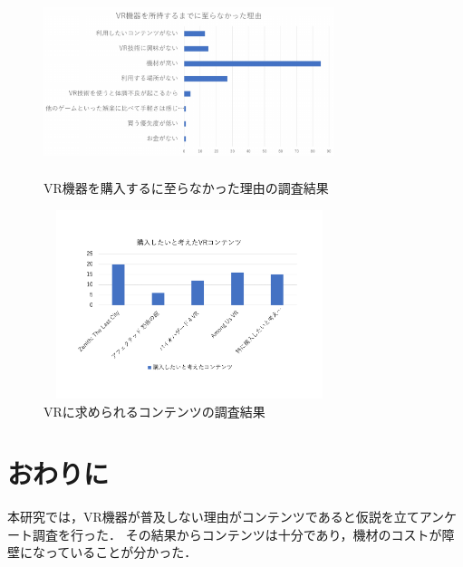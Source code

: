 \documentclass[twocolumn,10pt,a4j]{ltjsarticle}
\begin{document}
\begin{figure}[h]
\begin{center}
 \includegraphics[clip,width=85mm,height=55mm]{vr機器を所持するまでに至らなかった理由.pdf}
\end{center}
 \caption{VR機器を購入するに至らなかった理由の調査結果}
 \label{fig:vr機器を所持するまでに至らなかった理由.pdf}
\end{figure}
\vspace{2mm}

\begin{figure}[h]
\begin{center}
 \includegraphics[clip,width=85mm,height=55mm]{購入したいと考えたvrコンテンツ.pdf}
\end{center}
 \caption{VRに求められるコンテンツの調査結果}
 \label{fig:購入したいと考えたvrコンテンツ.pdf}
\end{figure}


\section{おわりに}
本研究では，VR機器が普及しない理由がコンテンツであると仮説を立てアンケート調査を行った．
その結果からコンテンツは十分であり，機材のコストが障壁になっていることが分かった．

\end{document}
